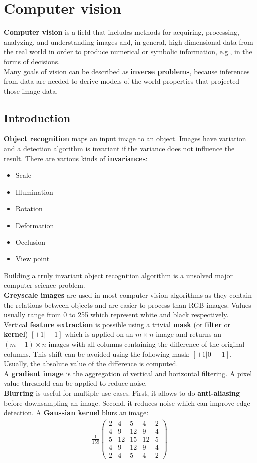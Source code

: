 \documentclass{report}
\begin{document}
\chapter{Computer vision}
{\bf Computer vision} is a field that includes methods for acquiring, processing, analyzing, and understanding images and, in general, high-dimensional data from the real world in order to produce numerical or symbolic information, e.g., in the forms of decisions. \\
Many goals of vision can be described as {\bf inverse problems}, because inferences from data are needed to derive models of the world properties that projected those image data.

\section{Introduction}
\label{chapter:cvinvariances}
{\bf Object recognition} maps an input image to an object. Images have variation and a detection algorithm is invariant if the variance does not influence the result. There are various kinds of {\bf invariances}:
\begin{itemize}
\item Scale
\item Illumination
\item Rotation
\item Deformation
\item Occlusion
\item View point
\end{itemize}
Building a truly invariant object recognition algorithm is a unsolved major computer science problem.
\\
{\bf Greyscale images} are used in most computer vision algorithms as they contain the relations between objects and are easier to process than RGB images. Values usually range from 0 to 255 which represent white and black respectively. \\
Vertical {\bf feature extraction} is possible using a trivial {\bf mask} (or {\bf filter} or {\bf kernel}) $[+1\vert -1]$ which is applied on an $m\times n$ image and returns an $(m-1)\times n$ images with all columns containing the difference of the original columns. This shift can be avoided using the following mask: $[+1\vert 0\vert -1]$.
Usually, the absolute value of the difference is computed. \\
A {\bf gradient image} is the aggregation of vertical and horizontal filtering. A pixel value threshold can be applied to reduce noise. \\
{\bf Blurring} is useful for multiple use cases. First, it allows to do {\bf anti-aliasing} before downsampling an image. Second, it reduces noise which can improve edge detection. A {\bf Gaussian kernel} blurs an image:
\begin{align*}
\frac{1}{159} \begin{pmatrix}
2 & 4 & 5 & 4 & 2 \\
4 & 9 & 12 & 9 & 4 \\
5 & 12 & 15 & 12 & 5 \\
4 & 9 & 12 & 9 & 4 \\
2 & 4 & 5 & 4 & 2
\end{pmatrix}
\end{align*}
\end{document}
